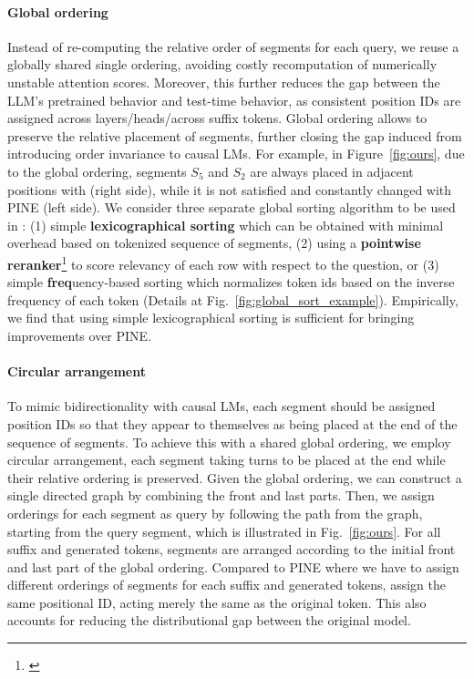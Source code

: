 \paragraph{Global ordering}
Instead of re-computing the relative order of segments for each query, we reuse a globally shared single ordering, avoiding costly recomputation of numerically unstable attention scores.
Moreover, this further reduces the gap between the LLM's pretrained behavior and test-time behavior, as consistent position IDs are assigned across layers/heads/across suffix tokens.
Global ordering allows to preserve the relative placement of segments, further closing the gap induced from introducing order invariance to causal LMs.
For example, in Figure~\ref{fig:ours}, due to the global ordering, segments $S_5$ and $S_2$ are always placed in adjacent positions with \ours{} (right side), while it is not satisfied and constantly changed with PINE (left side). 
We consider three separate global sorting algorithm to be used in \ours{}: (1) simple \textbf{lexicographical sorting} which can be obtained with minimal overhead based on tokenized sequence of segments, (2) using a \textbf{pointwise reranker}\footnote{\href{https://huggingface.co/castorini/monot5-base-msmarco-10k}{}} to score relevancy of each row with respect to the question, or (3) simple \textbf{freq}uency-based sorting which normalizes token ids based on the inverse frequency of each token (Details at Fig.~\ref{fig:global_sort_example}). Empirically, we find that using simple lexicographical sorting is sufficient for bringing improvements over PINE. %

\paragraph{Circular arrangement}
To mimic bidirectionality with causal LMs, each segment should be assigned position IDs so that they appear to themselves as being placed at the end of the sequence of segments.
To achieve this with a shared global ordering, we employ circular arrangement, each segment taking turns to be placed at the end while their relative ordering is preserved.
Given the global ordering, we can construct a single directed graph by combining the front and last parts. Then, we assign orderings for each segment as query by following the path from the graph, starting from the query segment, which is illustrated in Fig.~\ref{fig:ours}. For all suffix and generated tokens, segments are arranged according to the initial front and last part of the global ordering. Compared to PINE where we have to assign different orderings of segments for each suffix and generated tokens, \ours{} assign the same positional ID, acting merely the same as the original token. This also accounts for reducing the distributional gap between the original model.
